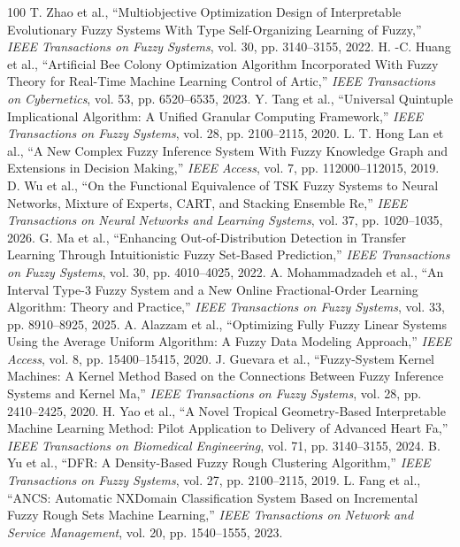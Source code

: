 \documentclass[journal]{IEEEtran}
\begin{document}
\begin{thebibliography}{100}
 T. Zhao et al., ``Multiobjective Optimization Design of Interpretable Evolutionary Fuzzy Systems With Type Self-Organizing Learning of Fuzzy,'' \emph{IEEE Transactions on Fuzzy Systems}, vol. 30, pp. 3140--3155, 2022.
 H. -C. Huang et al., ``Artificial Bee Colony Optimization Algorithm Incorporated With Fuzzy Theory for Real-Time Machine Learning Control of Artic,'' \emph{IEEE Transactions on Cybernetics}, vol. 53, pp. 6520--6535, 2023.
 Y. Tang et al., ``Universal Quintuple Implicational Algorithm: A Unified Granular Computing Framework,'' \emph{IEEE Transactions on Fuzzy Systems}, vol. 28, pp. 2100--2115, 2020.
 L. T. Hong Lan et al., ``A New Complex Fuzzy Inference System With Fuzzy Knowledge Graph and Extensions in Decision Making,'' \emph{IEEE Access}, vol. 7, pp. 112000--112015, 2019.
 D. Wu et al., ``On the Functional Equivalence of TSK Fuzzy Systems to Neural Networks, Mixture of Experts, CART, and Stacking Ensemble Re,'' \emph{IEEE Transactions on Neural Networks and Learning Systems}, vol. 37, pp. 1020--1035, 2026.
 G. Ma et al., ``Enhancing Out-of-Distribution Detection in Transfer Learning Through Intuitionistic Fuzzy Set-Based Prediction,'' \emph{IEEE Transactions on Fuzzy Systems}, vol. 30, pp. 4010--4025, 2022.
 A. Mohammadzadeh et al., ``An Interval Type-3 Fuzzy System and a New Online Fractional-Order Learning Algorithm: Theory and Practice,'' \emph{IEEE Transactions on Fuzzy Systems}, vol. 33, pp. 8910--8925, 2025.
 A. Alazzam et al., ``Optimizing Fully Fuzzy Linear Systems Using the Average Uniform Algorithm: A Fuzzy Data Modeling Approach,'' \emph{IEEE Access}, vol. 8, pp. 15400--15415, 2020.
 J. Guevara et al., ``Fuzzy-System Kernel Machines: A Kernel Method Based on the Connections Between Fuzzy Inference Systems and Kernel Ma,'' \emph{IEEE Transactions on Fuzzy Systems}, vol. 28, pp. 2410--2425, 2020.
 H. Yao et al., ``A Novel Tropical Geometry-Based Interpretable Machine Learning Method: Pilot Application to Delivery of Advanced Heart Fa,'' \emph{IEEE Transactions on Biomedical Engineering}, vol. 71, pp. 3140--3155, 2024.
 B. Yu et al., ``DFR: A Density-Based Fuzzy Rough Clustering Algorithm,'' \emph{IEEE Transactions on Fuzzy Systems}, vol. 27, pp. 2100--2115, 2019.
 L. Fang et al., ``ANCS: Automatic NXDomain Classification System Based on Incremental Fuzzy Rough Sets Machine Learning,'' \emph{IEEE Transactions on Network and Service Management}, vol. 20, pp. 1540--1555, 2023.

\end{thebibliography}
\end{document}
